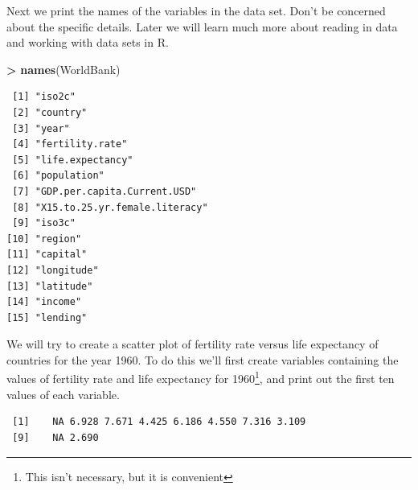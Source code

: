 \documentclass[]{krantz}
\makeatletter
\newenvironment{Shaded}{\begin{snugshade}}{\end{snugshade}}
\newcommand{\KeywordTok}[1]{\textcolor[rgb]{0.27,0.27,0.27}{\textbf{#1}}}
\newcommand{\DecValTok}[1]{\textcolor[rgb]{0.06,0.06,0.06}{#1}}
\newcommand{\StringTok}[1]{\textcolor[rgb]{0.5,0.5,0.5}{#1}}
\newcommand{\OperatorTok}[1]{\textcolor[rgb]{0.43,0.43,0.43}{\textbf{#1}}}
\newcommand{\NormalTok}[1]{#1}
\newenvironment{kframe}{%
\medskip{}
\setlength{\fboxsep}{.8em}
 \def\at@end@of@kframe{}%
 \ifinner\ifhmode%
  \def\at@end@of@kframe{\end{minipage}}%
  \begin{minipage}{\columnwidth}%
 \fi\fi%
 \def\FrameCommand##1{\hskip\@totalleftmargin \hskip-\fboxsep
 \colorbox{shadecolor}{##1}\hskip-\fboxsep
     \hskip-\linewidth \hskip-\@totalleftmargin \hskip\columnwidth}%
 \MakeFramed {\advance\hsize-\width
   \@totalleftmargin\z@ \linewidth\hsize
   \@setminipage}}%
 {\par\unskip\endMakeFramed%
 \at@end@of@kframe}
\renewenvironment{Shaded}{\begin{kframe}}{\end{kframe}}
\makeatother
\begin{document}
Next we print the names of the variables in the data set. Don't be
concerned about the specific details. Later we will learn much more
about reading in data and working with data sets in R.

\begin{Shaded}
\begin{Highlighting}[]
\OperatorTok{>}\StringTok{ }\KeywordTok{names}\NormalTok{(WorldBank)}
\end{Highlighting}
\end{Shaded}

\begin{verbatim}
 [1] "iso2c"                       
 [2] "country"                     
 [3] "year"                        
 [4] "fertility.rate"              
 [5] "life.expectancy"             
 [6] "population"                  
 [7] "GDP.per.capita.Current.USD"  
 [8] "X15.to.25.yr.female.literacy"
 [9] "iso3c"                       
[10] "region"                      
[11] "capital"                     
[12] "longitude"                   
[13] "latitude"                    
[14] "income"                      
[15] "lending"                     
\end{verbatim}

We will try to create a scatter plot of fertility rate versus life
expectancy of countries for the year 1960. To do this we'll first create
variables containing the values of fertility rate and life expectancy
for 1960\footnote{This isn't necessary, but it is convenient}, and print
out the first ten values of each variable.

\begin{Shaded}
\end{Shaded}

\begin{verbatim}
 [1]    NA 6.928 7.671 4.425 6.186 4.550 7.316 3.109
 [9]    NA 2.690
\end{verbatim}
\end{document}

